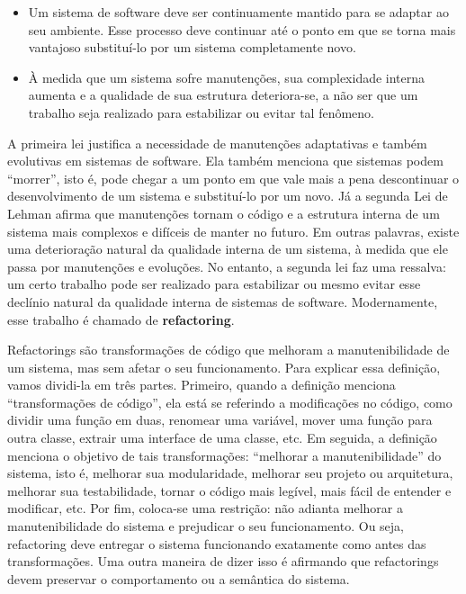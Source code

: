 \documentclass[
  11pt,
  twoside]{book}
\begin{document}
\begin{itemize}
\item
  Um sistema de software deve ser continuamente mantido para se adaptar
  ao seu ambiente. Esse processo deve continuar até o ponto em que se
  torna mais vantajoso substituí-lo por um sistema completamente novo.
\item
  À medida que um sistema sofre manutenções, sua complexidade interna
  aumenta e a qualidade de sua estrutura deteriora-se, a não ser que um
  trabalho seja realizado para estabilizar ou evitar tal fenômeno.
\end{itemize}

A primeira lei justifica a necessidade de manutenções adaptativas e
também evolutivas em sistemas de software. Ela também menciona que
sistemas podem ``morrer'', isto é, pode chegar a um ponto em que vale
mais a pena descontinuar o desenvolvimento de um sistema e substituí-lo
por um novo. Já a segunda Lei de Lehman afirma que manutenções tornam o
código e a estrutura interna de um sistema mais complexos e difíceis de
manter no futuro. Em outras palavras, existe uma deterioração natural da
qualidade interna de um sistema, à medida que ele passa por manutenções
e evoluções. No entanto, a segunda lei faz uma ressalva: um certo
trabalho pode ser realizado para estabilizar ou mesmo evitar esse
declínio natural da qualidade interna de sistemas de software.
Modernamente, esse trabalho é chamado de \textbf{refactoring}.

 Refactorings são transformações de código
que melhoram a manutenibilidade de um sistema, mas sem afetar o seu
funcionamento. Para explicar essa definição, vamos dividi-la em três
partes. Primeiro, quando a definição menciona ``transformações de
código'', ela está se referindo a modificações no código, como dividir
uma função em duas, renomear uma variável, mover uma função para outra
classe, extrair uma interface de uma classe, etc. Em seguida, a
definição menciona o objetivo de tais transformações: ``melhorar a
manutenibilidade'' do sistema, isto é, melhorar sua modularidade,
melhorar seu projeto ou arquitetura, melhorar sua testabilidade, tornar
o código mais legível, mais fácil de entender e modificar, etc. Por fim,
coloca-se uma restrição: não adianta melhorar a manutenibilidade do
sistema e prejudicar o seu funcionamento. Ou seja, refactoring deve
entregar o sistema funcionando exatamente como antes das transformações.
Uma outra maneira de dizer isso é afirmando que refactorings devem
preservar o comportamento ou a semântica do sistema.
\end{document}
